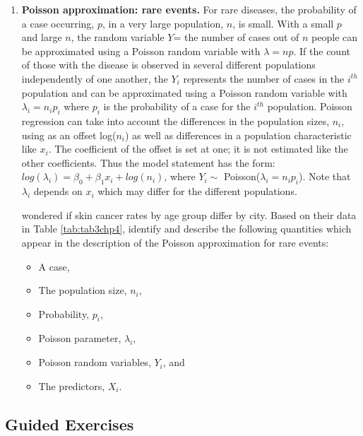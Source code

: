 \documentclass[
]{krantz}
\providecommand{\tightlist}{%
  \setlength{\itemsep}{0pt}\setlength{\parskip}{0pt}}
\begin{document}
\begin{enumerate}
\def\labelenumi{\arabic{enumi}.}
\setcounter{enumi}{15}
\item
  \textbf{Poisson approximation: rare events.} For rare diseases, the probability of a case occurring, \(p\), in a very large population, \(n\), is small. With a small \(p\) and large \(n\), the random variable \(Y\)= the number of cases out of \(n\) people can be approximated using a Poisson random variable with \(\lambda = np\). If the count of those with the disease is observed in several different populations independently of one another, the \(Y_i\) represents the number of cases in the \(i^{th}\) population and can be approximated using a Poisson random variable with \(\lambda_i=n_ip_i\) where \(p_i\) is the probability of a case for the \(i^{th}\) population. Poisson regression can take into account the differences in the population sizes, \(n_i\), using as an offset log(\(n_i\)) as well as differences in a population characteristic like \(x_i\). The coefficient of the offset is set at one; it is not estimated like the other coefficients. Thus the model statement has the form: \(log(\lambda_i) = \beta_0+\beta_1x_i + log(n_i)\), where \(Y_i \sim\) Poisson(\(\lambda_i = n_i p_i\)). Note that \(\lambda_i\) depends on \(x_i\) which may differ for the different populations.

  \citet{Scotto1974} wondered if skin cancer rates by age group differ by city. Based on their data in Table \ref{tab:tab3chp4}, identify and describe the following quantities which appear in the description of the Poisson approximation for rare events:

  \begin{itemize}
  \tightlist
  \item
    A case,
  \item
    The population size, \(n_i\),
  \item
    Probability, \(p_i\),
  \item
    Poisson parameter, \(\lambda_i\),
  \item
    Poisson random variables, \(Y_i\), and
  \item
    The predictors, \(X_i\).
  \end{itemize}
\end{enumerate}

\hypertarget{guided-exercises-3}{%
\subsection{Guided Exercises}\label{guided-exercises-3}}
\end{document}
